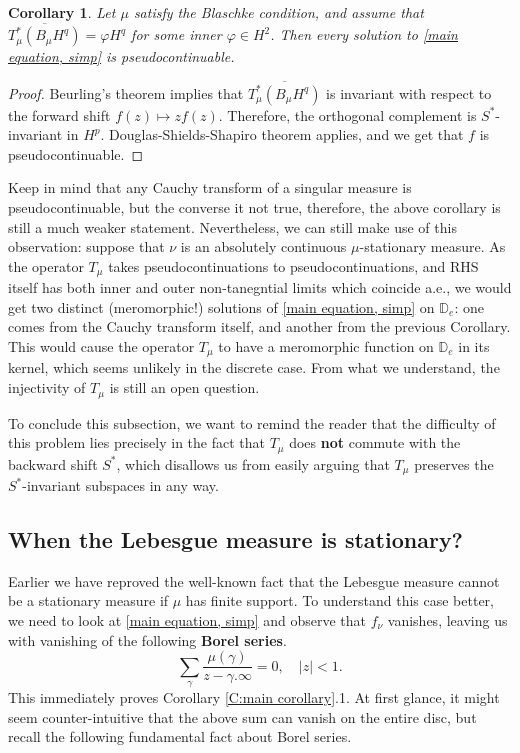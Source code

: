 \documentclass[11pt]{article}
\newtheorem{corollary}{Corollary}[section]
\begin{document}
\begin{corollary}
	Let $\mu$ satisfy the Blaschke condition, and assume that $\overline{T_\mu^*(B_\mu H^q)} = \varphi H^q$ for some inner $\varphi \in H^2$. Then every solution to \eqref{main equation, simp} is pseudocontinuable.
\end{corollary}
\begin{proof}
	Beurling's theorem implies that $\overline{T_\mu^*(B_\mu H^q)}$ is invariant with respect to the forward shift $f(z) \mapsto zf(z)$. Therefore, the orthogonal complement is $S^*$-invariant in $H^p$. Douglas-Shields-Shapiro theorem applies, and we get that $f$ is pseudocontinuable.
\end{proof}

Keep in mind that any Cauchy transform of a singular measure is pseudocontinuable, but the converse it not true, therefore, the above corollary is still a much weaker statement. Nevertheless, we can still make use of this observation: suppose that $\nu$ is an absolutely continuous $\mu$-stationary measure. As the operator $T_\mu$ takes pseudocontinuations to pseudocontinuations, and RHS itself has both inner and outer non-tanegntial limits which coincide a.e., we would get two distinct (meromorphic!) solutions of \eqref{main equation, simp} on $\mathbb{D}_e$: one comes from the Cauchy transform itself, and another from the previous Corollary. This would cause the operator $T_\mu$ to have a meromorphic function on $\mathbb{D}_e$ in its kernel, which seems unlikely in the discrete case. From what we understand, the injectivity of $T_\mu$ is still an open question.


To conclude this subsection, we want to remind the reader that the difficulty of this problem lies precisely in the fact that $T_\mu$ does \textbf{not} commute with the backward shift $S^*$, which disallows us from easily arguing that $T_\mu$ preserves the $S^*$-invariant subspaces in any way.
\subsection{When the Lebesgue measure is stationary?}

Earlier we have reproved the well-known fact that the Lebesgue measure cannot be a stationary measure if $\mu$ has finite support. To understand this case better, we need to look at \eqref{main equation, simp} and observe that $f_\nu$ vanishes, leaving us with vanishing of the following \textbf{Borel series}.
\begin{equation}
	\label{Lebesgue equation}
	\sum_{\gamma} \frac{\mu(\gamma)}{z - \gamma.\infty} = 0, \quad |z| < 1.
\end{equation}
This immediately proves Corollary \ref{C:main corollary}.1. At first glance, it might seem counter-intuitive that the above sum can vanish on the entire disc, but recall the following fundamental fact about Borel series.
\end{document}
